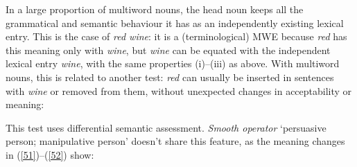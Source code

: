 \documentclass[output=paper]{langsci/langscibook}
\begin{document}
In a large proportion of multiword nouns, the head noun keeps all the grammatical and semantic behaviour it has as an independently existing lexical entry. This is the case of \textit{red wine}: it is a (terminological) MWE because \textit{red} has this meaning only with \textit{wine}, but \textit{wine} can be equated with the independent lexical entry \textit{wine}, with the same properties (i)--(iii) as above. With multiword nouns, this is related to another test: \textit{red} can usually be inserted in sentences with \textit{wine} or removed from them, without unexpected changes in acceptability or meaning:

\begin{exe}
\ex \label{49}
\begin{xlist}
\end{xlist}
\end{exe}

\begin{exe}
\ex \label{50}
\begin{xlist}
\end{xlist}
\end{exe}

\noindent This test uses differential semantic assessment. \textit{Smooth operator} ‘persuasive person; manipulative person’ doesn’t share this feature, as the meaning changes in (\ref{51})–(\ref{52}) show:


\begin{exe}
\ex \label{51}
\begin{xlist}
\end{xlist}
\end{exe}

\begin{exe}
\ex \label{52}
\begin{xlist}
\end{xlist}
\end{exe}
\end{document}
